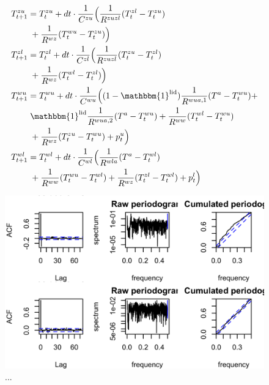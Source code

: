 \documentclass[lettersize,journal]{IEEEtran}
\begin{document}
\begin{subequations}\label{eq:StateSpaceModel}
    \begin{align}
        T^{zu}_{t+1} & = T^{zu}_{t} + dt \cdot \frac{1}{C^{zu}}\Bigl( \frac{1}{R^{zuzl}} (T^{zl}_{t} - T^{zu}_{t}) \notag                            \\ & \mspace{5mu} + \frac{1}{R^{wz}} (T^{wu}_{t} - T^{zu}_{t}) \Bigr) \\
        T^{zl}_{t+1} & = T^{zl}_{t} + dt \cdot \frac{1}{C^{zl}}\Bigl( \frac{1}{R^{zuzl}} (T^{zu}_{t} - T^{zl}_{t}) \notag                            \\ & \mspace{5mu} + \frac{1}{R^{wz}} (T^{wl}_{t} - T^{zl}_{t}) \Bigr) \\
        T^{wu}_{t+1} & = T^{wu}_{t} + dt \cdot \frac{1}{C^{wu}}\Bigl( (1-\mathbbm{1}^{\text{lid}}) \frac{1}{R^{wua,1}} (T^{a} - T^{wu}_{t}) \notag + \\ & \mspace{5mu} \mathbbm{1}^{\text{lid}} \frac{1}{R^{wua,2}} (T^{a} - T^{wu}_{t}) + \frac{1}{R^{ww}} (T^{wl}_{t} - T^{wu}_{t}) \notag \\ & \mspace{5mu} + \frac{1}{R^{wz}} (T^{zu}_{t} - T^{wu}_{t}) + p^{u}_{t} \Bigr) \\
        T^{wl}_{t+1} & = T^{wl}_{t} + dt \cdot \frac{1}{C^{wl}}\Bigl( \frac{1}{R^{wla}} (T^{a} - T^{wl}_{t}) \notag                                  \\ & \mspace{5mu} + \frac{1}{R^{ww}} (T^{wu}_{t} - T^{wl}_{t}) + \frac{1}{R^{wz}} (T^{zl}_{t} - T^{wl}_{t}) + p^{l}_{t} \Bigr)
    \end{align}
\end{subequations}

\begin{figure}[!t]
    \centering
    \includegraphics[width=\columnwidth]{figures/4thOrderModelValidation.png}
    \caption{...}
    \label{fig:4thOrderModelValidation}
\end{figure}
\end{document}
